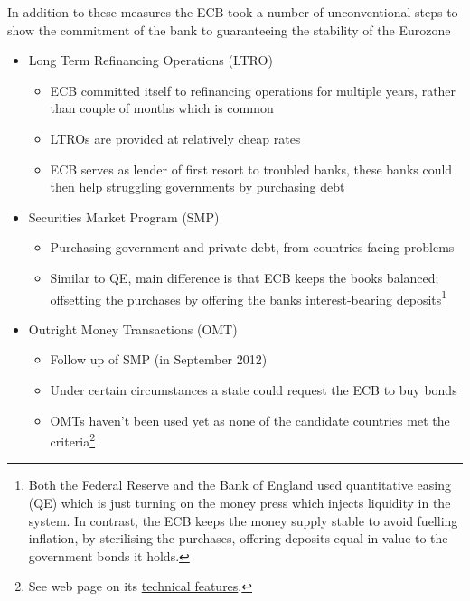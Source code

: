\documentclass{tufte-handout}
\begin{document}
In addition to these measures the ECB took a number of unconventional steps to show the commitment of the bank to guaranteeing the stability of the Eurozone
\begin{itemize}
  \item Long Term Refinancing Operations (LTRO)
  \begin{itemize}
    \item ECB committed itself to refinancing operations for multiple years, rather than couple of months which is common    
    \item LTROs are provided at relatively cheap rates
    \item ECB serves as lender of first resort to troubled banks, these banks could then help struggling governments by purchasing debt    
  \end{itemize}
  \item Securities Market Program (SMP)
  \begin{itemize}
    \item Purchasing government and private debt, from countries facing problems
    \item Similar to QE, main difference is that ECB keeps the books balanced; offsetting the purchases by offering the banks interest-bearing deposits\footnote{Both the Federal Reserve and the Bank of England used quantitative easing (QE) which is just turning on the money press which injects liquidity in the system. In contrast, the ECB keeps the money supply stable to avoid fuelling inflation, by sterilising the purchases, offering deposits equal in value to the government bonds it holds.}
  \end{itemize}
  \item Outright Money Transactions (OMT)
  \begin{itemize}
    \item Follow up of SMP (in September 2012)
    \item Under certain circumstances a state could request the ECB to buy bonds     
    \item OMTs haven't been used yet as none of the candidate countries met the criteria\footnote{See web page on its \href{https://www.ecb.europa.eu/press/pr/date/2012/html/pr120906_1.en.html}{technical features}.}
  \end{itemize}
\end{itemize}
\end{document}
